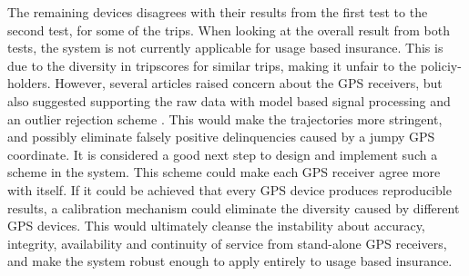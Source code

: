 The remaining devices disagrees with their results from the first test to the second test, for some of the trips. When looking at the overall result from both tests, the system is not currently applicable for usage based insurance. This is due to the diversity in tripscores for similar trips, making it unfair to the policiy-holders. However, several articles raised concern about the GPS receivers, but also suggested supporting the raw data with model based signal processing and an outlier rejection scheme\citep{art:challenges_smartphone_ubi} \citep{art:insurtelematics} \citep{art:smartphones_for_monitoring_and_ubi}. This would make the trajectories more stringent, and possibly eliminate falsely positive delinquencies caused by a jumpy GPS coordinate. It is considered a good next step to design and implement such a scheme in the system. This scheme could make each GPS receiver agree more with itself. If it could be achieved that every GPS device produces reproducible results, a calibration mechanism could eliminate the diversity caused by different GPS devices. This would ultimately cleanse the instability about accuracy, integrity, availability and continuity of service from stand-alone GPS receivers, and make the system robust enough to apply entirely to usage based insurance.

